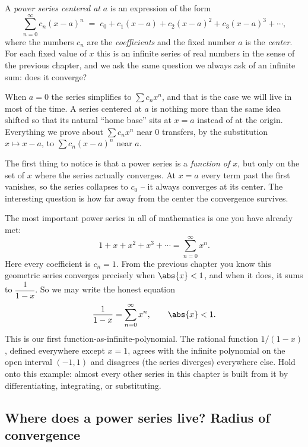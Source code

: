 \begin{definition}
\label{ch30:def-power-series}
A \emph{power series centered at} $a$ is an expression of the form
\[
  \sum_{n=0}^{\infty} c_n (x-a)^n
  \;=\; c_0 + c_1(x-a) + c_2(x-a)^2 + c_3(x-a)^3 + \cdots,
\]
where the numbers $c_n$ are the \emph{coefficients} and the fixed number $a$ is the \emph{center}. For each fixed value of $x$ this is an infinite series of real numbers in the sense of the previous chapter, and we ask the same question we always ask of an infinite sum: does it converge?
\end{definition}

When $a=0$ the series simplifies to $\sum c_n x^n$, and that is the case we will live in most of the time. A series centered at $a$ is nothing more than the same idea shifted so that its natural ``home base'' sits at $x=a$ instead of at the origin. Everything we prove about $\sum c_n x^n$ near $0$ transfers, by the substitution $x \mapsto x-a$, to $\sum c_n (x-a)^n$ near $a$.

The first thing to notice is that a power series is a \emph{function of $x$}, but only on the set of $x$ where the series actually converges. At $x=a$ every term past the first vanishes, so the series collapses to $c_0$ -- it always converges at its center. The interesting question is how far away from the center the convergence survives.

\begin{example}
\label{ch30:ex-geometric}
The most important power series in all of mathematics is one you have already met:
\[
  1 + x + x^2 + x^3 + \cdots = \sum_{n=0}^{\infty} x^n.
\]
Here every coefficient is $c_n = 1$. From the previous chapter you know this geometric series converges precisely when $\abs{x} < 1$, and when it does, it sums to $\dfrac{1}{1-x}$. So we may write the honest equation
\[
  \frac{1}{1-x} = \sum_{n=0}^{\infty} x^n, \qquad \abs{x} < 1.
\]
This is our first function-as-infinite-polynomial. The rational function $1/(1-x)$, defined everywhere except $x=1$, agrees with the infinite polynomial on the open interval $(-1,1)$ and disagrees (the series diverges) everywhere else. Hold onto this example: almost every other series in this chapter is built from it by differentiating, integrating, or substituting.
\end{example}

\subsection{Where does a power series live? Radius of convergence}

